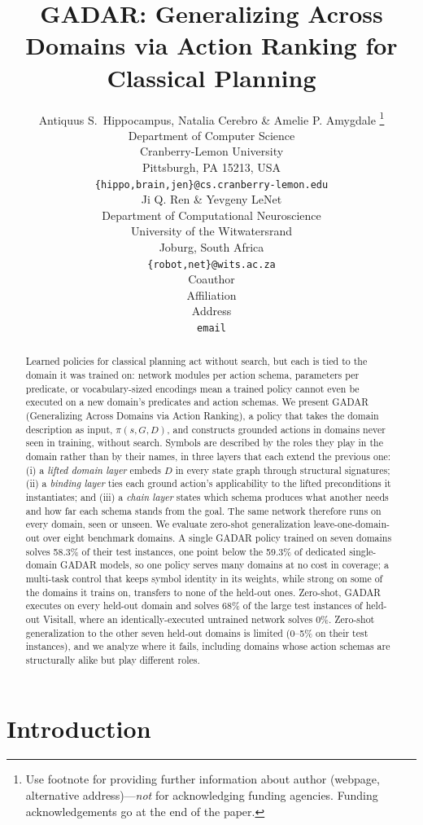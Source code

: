 \documentclass{article} %
\title{
GADAR: Generalizing Across Domains via Action Ranking for Classical Planning
}
\author{Antiquus S.~Hippocampus, Natalia Cerebro \& Amelie P. Amygdale \thanks{ Use footnote for providing further information
about author (webpage, alternative address)---\emph{not} for acknowledging
funding agencies.  Funding acknowledgements go at the end of the paper.} \\
Department of Computer Science\\
Cranberry-Lemon University\\
Pittsburgh, PA 15213, USA \\
\texttt{\{hippo,brain,jen\}@cs.cranberry-lemon.edu} \\
\And
Ji Q. Ren \& Yevgeny LeNet \\
Department of Computational Neuroscience \\
University of the Witwatersrand \\
Joburg, South Africa \\
\texttt{\{robot,net\}@wits.ac.za} \\
\AND
Coauthor \\
Affiliation \\
Address \\
\texttt{email}
}
\newcommand{\gadar}{GADAR}                 %
\newcommand{\todonum}[1]{#1}
\begin{document}
\maketitle

\begin{abstract}

Learned policies for classical planning act without search, but each is tied to the domain it was trained on: network modules per action schema, parameters per predicate, or vocabulary-sized encodings mean a trained policy cannot even be executed on a new domain's predicates and action schemas. We present \gadar{} (Generalizing Across Domains via Action Ranking), a policy that takes the domain description as input, $\pi(s, G, D)$, and constructs grounded actions in domains never seen in training, without search. Symbols are described by the roles they play in the domain rather than by their names, in three layers that each extend the previous one: (i) a \emph{lifted domain layer} embeds $D$ in every state graph through structural signatures; (ii) a \emph{binding layer} ties each ground action's applicability to the lifted preconditions it instantiates; and (iii) a \emph{chain layer} states which schema produces what another needs and how far each schema stands from the goal. The same network therefore runs on every domain, seen or unseen. We evaluate zero-shot generalization leave-one-domain-out over eight benchmark domains. A single \gadar{} policy trained on seven domains solves 58.3\% of their test instances, one point below the 59.3\% of dedicated single-domain \gadar{} models, so one policy serves many domains at no cost in coverage; a multi-task control that keeps symbol identity in its weights, while strong on some of the domains it trains on, transfers to none of the held-out ones. Zero-shot, \gadar{} executes on every held-out domain and solves \todonum{68}\% of the large test instances of held-out Visitall, where an identically-executed untrained network solves \todonum{0}\%. Zero-shot generalization to the other seven held-out domains is limited (\todonum{0--5}\% on their test instances), and we analyze where it fails, including domains whose action schemas are structurally alike but play different roles.

\end{abstract}

\section{Introduction}
\end{document}
